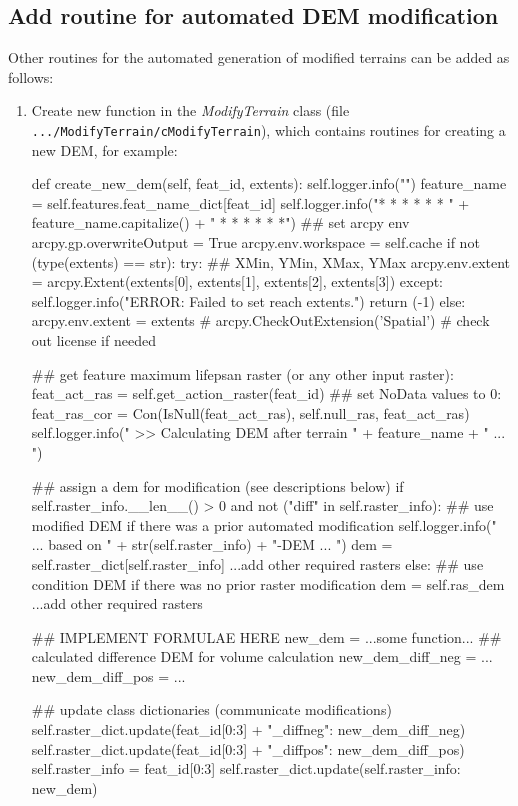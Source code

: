 \subsection{Add routine for automated DEM modification}\label{sec:addmtmod}
Other routines for the automated generation of modified terrains can be added as follows:
\begin{enumerate}
	\item Create new function in the \textit{ModifyTerrain} class (file \texttt{.../ModifyTerrain/cModifyTerrain}), which contains routines for creating a new DEM, for example:\\
	\begin{python}
  def create_new_dem(self, feat_id, extents):
    self.logger.info("") 
    feature_name = self.features.feat_name_dict[feat_id]
    self.logger.info("* *   * *   * * " + feature_name.capitalize() + " * *   * *  * *")
    ## set arcpy env
    arcpy.gp.overwriteOutput = True
    arcpy.env.workspace = self.cache
    if not (type(extents) == str):
      try:
        ## XMin, YMin, XMax, YMax
        arcpy.env.extent = arcpy.Extent(extents[0], extents[1], extents[2], extents[3])
      except:
        self.logger.info("ERROR: Failed to set reach extents.")
        return (-1)
    else:
      arcpy.env.extent = extents
    # arcpy.CheckOutExtension('Spatial')  # check out license if needed

    ## get feature maximum lifepsan raster (or any other input raster):
    feat_act_ras = self.get_action_raster(feat_id)
    ## set NoData values to 0:
    feat_ras_cor = Con(IsNull(feat_act_ras), self.null_ras, feat_act_ras)
    self.logger.info("  >> Calculating DEM after terrain " + feature_name + " ... ")

    ## assign a dem for modification (see descriptions below)
    if self.raster_info.__len__() > 0 and not ("diff" in self.raster_info):
      ## use modified DEM if there was a prior automated modification
      self.logger.info("   ... based on " + str(self.raster_info) + "-DEM  ... ")
      dem = self.raster_dict[self.raster_info]
      ...add other required rasters
    else:
      ## use condition DEM if there was no prior raster modification 
      dem = self.ras_dem
      ...add other required rasters

    ## IMPLEMENT FORMULAE HERE
    new_dem = ...some function...
    ## calculated difference DEM for volume calculation
    new_dem_diff_neg = ...
    new_dem_diff_pos = ...

    ## update class dictionaries (communicate modifications)
    self.raster_dict.update({feat_id[0:3] + "_diffneg": new_dem_diff_neg})
    self.raster_dict.update({feat_id[0:3] + "_diffpos": new_dem_diff_pos})
    self.raster_info = feat_id[0:3]
    self.raster_dict.update({self.raster_info: new_dem})


\end{python}
\end{enumerate}
